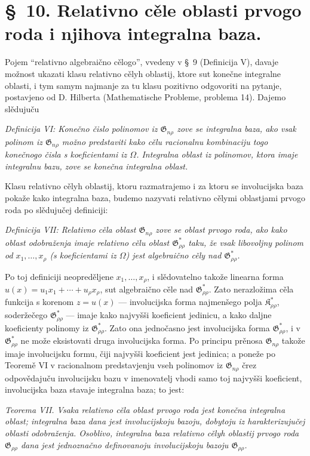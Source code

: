 \documentclass[11pt]{article}
\providecommand{\Kfield}{\mathfrak{K}}
\providecommand{\Gdom}{\mathfrak{G}}
\begin{document}
\section*{\S\ 10. Relativno cěle oblasti prvogo roda i njihova integralna baza.}

Pojem ``relativno algebraično cělogo'', vvedeny v \S\ 9 (Definicija V), davaje možnost ukazati klasu relativno cělyh oblastij, ktore sut konečne integralne oblasti, i tym samym najmanje za tu klasu pozitivno odgovoriti na pytanje, postavjeno od D. Hilberta (Mathematische Probleme, problema 14). Dajemo slědujuču

{\itshape Definicija VI: Konečno čislo polinomov iz $\Gdom_{n\rho}$ zove se integralna baza, ako vsak polinom iz $\Gdom_{n\rho}$ možno predstaviti kako cělu racionalnu kombinaciju togo konečnogo čisla s koeficientami iz $\Omega$. Integralna oblast iz polinomov, ktora imaje integralnu bazu, zove se konečna integralna oblast.}

Klasu relativno cělyh oblastij, ktoru razmatrajemo i za ktoru se involucijska baza pokaže kako integralna baza, budemo nazyvati relativno cělymi oblastjami prvogo roda po slědujučej definiciji:

{\itshape Definicija VII: Relativno cěla oblast $\Gdom_{n\rho}$ zove se oblast prvogo roda, ako kako oblast odobraženja imaje relativno cělu oblast $\Gdom^*_{\rho\rho}$ taku, že vsak libovoljny polinom od $x_1,\ldots,x_\rho$ (s koeficientami iz $\Omega$) jest algebraično cěly nad $\Gdom^*_{\rho\rho}$.}

Po toj definiciji neopreděljene $x_1,\ldots,x_\rho$, i slědovatelno takože linearna forma $u(x)=u_1x_1+\cdots+u_\rho x_\rho$, sut algebraično cěle nad $\Gdom^*_{\rho\rho}$. Zato nerazložima cěla funkcija s korenom $z=u(x)$ --- involucijska forma najmenšego polja $\Kfield^*_{\rho\rho}$, soderžečego $\Gdom^*_{\rho\rho}$ --- imaje kako najvyšši koeficient jedinicu, a kako daljne koeficienty polinomy iz $\Gdom^*_{\rho\rho}$. Zato ona jednočasno jest involucijska forma $\Gdom^*_{\rho\rho}$, i v $\Gdom^*_{\rho\rho}$ ne može eksistovati druga involucijska forma. Po principu prěnosa $\Gdom_{n\rho}$ takože imaje involucijsku formu, čiji najvyšši koeficient jest jedinica; a poneže po Teoremě VI v racionalnom predstavjenju vseh polinomov iz $\Gdom_{n\rho}$ črez odpovědajuču involucijsku bazu v imenovatelj vhodi samo toj najvyšši koeficient, involucijska baza stavaje integralna baza; to jest:

{\itshape Teorema VII. Vsaka relativno cěla oblast prvogo roda jest konečna integralna oblast; integralna baza dana jest involucijskoju bazoju, dobytoju iz harakterizujučej oblasti odobraženja. Osoblivo, integralna baza relativno cělyh oblastij prvogo roda $\Gdom_{\rho\rho}$ dana jest jednoznačno definovanoju involucijskoju bazoju $\Gdom_{\rho\rho}$.}
\end{document}
